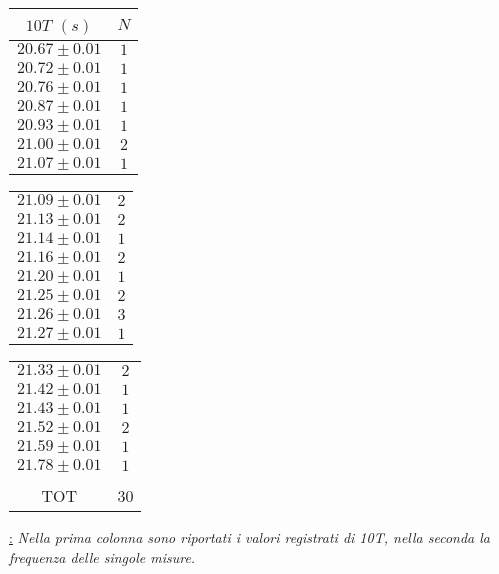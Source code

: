 \documentclass[12pt, a4paper]{article}
\begin{document}
\begin{table}[!htb]
    \begin{minipage}[t]{.3\linewidth}
    \centering
        \begin{tabular}{|c|c|}
            \hline
            $10T$ $(s)$&$N$\\
            \hline
            $20.67\pm 0.01$ & $1$\\
            $20.72\pm 0.01$ & $1$\\
            $20.76\pm 0.01$ & $1$\\
            $20.87\pm 0.01$ & $1$\\
            $20.93\pm 0.01$ & $1$\\
            $21.00\pm 0.01$ & $2$\\
            $21.07\pm 0.01$ & $1$\\
            \hline
        \end{tabular}
    \end{minipage}
    \begin{minipage}[t]{.3\linewidth}
    \centering
        \begin{tabular}{|c|c|}
            \hline
            
            $21.09\pm 0.01$ & $2$\\
            $21.13\pm 0.01$ & $2$\\
            $21.14\pm 0.01$ & $1$\\
            $21.16\pm 0.01$ & $2$\\
            $21.20\pm 0.01$ & $1$\\
            $21.25\pm 0.01$ & $2$\\
            $21.26\pm 0.01$ & $3$\\
            $21.27\pm 0.01$ & $1$\\
            \hline
        \end{tabular}
    \end{minipage}
    \begin{minipage}[t]{.3\linewidth}
    \centering
        \begin{tabular}{|c|c|}
            \hline
            
            
            $21.33\pm 0.01$ & $2$\\
            $21.42\pm 0.01$ & $1$\\
            $21.43\pm 0.01$ & $1$\\
            $21.52\pm 0.01$ & $2$\\
            $21.59\pm 0.01$ & $1$\\
            $21.78\pm 0.01$ & $1$\\
            &\\
            \hline
            \hline
            TOT & 30\\
            \hline
        \end{tabular}
        \label{TAB:1}
    \end{minipage} 
\end{table}
\begin{center}
   \href{Tabella 1} : \textit{\footnotesize{Nella prima colonna sono riportati i valori registrati di 10T, nella seconda la frequenza delle singole misure.}}
\end{center}
\end{document}
